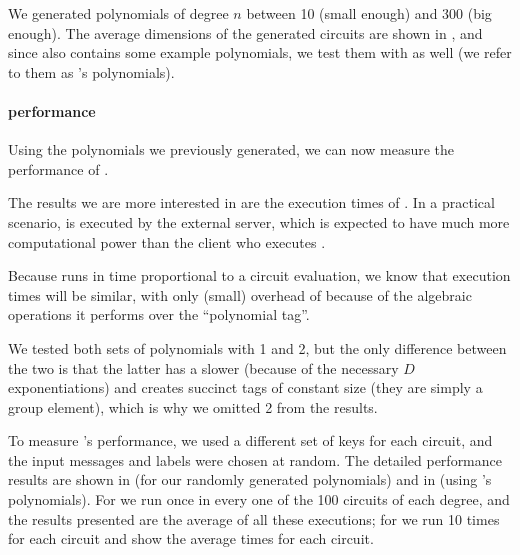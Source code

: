 We generated polynomials of degree $n$ between 10 (small enough) and 300 (big
enough). The average dimensions of the generated circuits are shown in
, and since 
also contains some example polynomials, we test them with
 as well (we refer to them as
's polynomials).



\paragraph*{ performance}
Using the polynomials we previously generated, we can now measure the
performance of .

The results we are more interested in are the execution times of \Eval.
In a practical scenario, \Eval is executed by the external server,
which is expected to have much more computational power than the client who
executes \Vrfy.

Because \Vrfy runs in time proportional to a circuit evaluation, we know that
execution times will be similar, with only (small) overhead of \Vrfy because of
the algebraic operations it performs over the ``polynomial tag''.

We tested both sets of polynomials with 1 and
2, but the only difference between the two is
that the latter has a slower \KeyGen (because of the necessary $D$
exponentiations) and creates succinct tags of constant size (they are simply
a group element), which is why we omitted 2
from the results.

To measure 's performance, we used a different
set of keys for each circuit, and the input messages and labels were chosen at
random. The detailed performance results are shown in 
(for our randomly generated polynomials) and in
 (using
's polynomials). For
 we run  once in every
one of the 100 circuits of each degree, and the results presented are the
average of all these executions; for  we run
 10 times for each circuit and show the average
times for each circuit.


